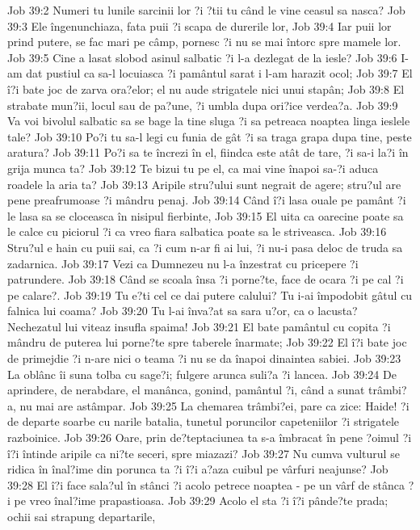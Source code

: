 Job 39:2  Numeri tu lunile sarcinii lor ?i ?tii tu când le vine ceasul sa nasca?
Job 39:3  Ele îngenunchiaza, fata puii ?i scapa de durerile lor,
Job 39:4  Iar puii lor prind putere, se fac mari pe câmp, pornesc ?i nu se mai întorc spre mamele lor.
Job 39:5  Cine a lasat slobod asinul salbatic ?i l-a dezlegat de la iesle?
Job 39:6  I-am dat pustiul ca sa-l locuiasca ?i pamântul sarat i l-am harazit ocol;
Job 39:7  El î?i bate joc de zarva ora?elor; el nu aude strigatele nici unui stapân;
Job 39:8  El strabate mun?ii, locul sau de pa?une, ?i umbla dupa ori?ice verdea?a.
Job 39:9  Va voi bivolul salbatic sa se bage la tine sluga ?i sa petreaca noaptea linga ieslele tale?
Job 39:10  Po?i tu sa-l legi cu funia de gât ?i sa traga grapa dupa tine, peste aratura?
Job 39:11  Po?i sa te încrezi în el, fiindca este atât de tare, ?i sa-i la?i în grija munca ta?
Job 39:12  Te bizui tu pe el, ca mai vine înapoi sa-?i aduca roadele la aria ta?
Job 39:13  Aripile stru?ului sunt negrait de agere; stru?ul are pene preafrumoase ?i mândru penaj.
Job 39:14  Când î?i lasa ouale pe pamânt ?i le lasa sa se cloceasca în nisipul fierbinte,
Job 39:15  El uita ca oarecine poate sa le calce cu piciorul ?i ca vreo fiara salbatica poate sa le striveasca.
Job 39:16  Stru?ul e hain cu puii sai, ca ?i cum n-ar fi ai lui, ?i nu-i pasa deloc de truda sa zadarnica.
Job 39:17  Vezi ca Dumnezeu nu l-a înzestrat cu pricepere ?i patrundere.
Job 39:18  Când se scoala însa ?i porne?te, face de ocara ?i pe cal ?i pe calare?.
Job 39:19  Tu e?ti cel ce dai putere calului? Tu i-ai împodobit gâtul cu falnica lui coama?
Job 39:20  Tu l-ai înva?at sa sara u?or, ca o lacusta? Nechezatul lui viteaz insufla spaima!
Job 39:21  El bate pamântul cu copita ?i mândru de puterea lui porne?te spre taberele înarmate;
Job 39:22  El î?i bate joc de primejdie ?i n-are nici o teama ?i nu se da înapoi dinaintea sabiei.
Job 39:23  La oblânc îi suna tolba cu sage?i; fulgere arunca suli?a ?i lancea.
Job 39:24  De aprindere, de nerabdare, el manânca, gonind, pamântul ?i, când a sunat trâmbi?a, nu mai are astâmpar.
Job 39:25  La chemarea trâmbi?ei, pare ca zice: Haide! ?i de departe soarbe cu narile batalia, tunetul poruncilor capeteniilor ?i strigatele razboinice.
Job 39:26  Oare, prin de?teptaciunea ta s-a îmbracat în pene ?oimul ?i î?i întinde aripile ca ni?te seceri, spre miazazi?
Job 39:27  Nu cumva vulturul se ridica în înal?ime din porunca ta ?i î?i a?aza cuibul pe vârfuri neajunse?
Job 39:28  El î?i face sala?ul în stânci ?i acolo petrece noaptea - pe un vârf de stânca ?i pe vreo înal?ime prapastioasa.
Job 39:29  Acolo el sta ?i î?i pânde?te prada; ochii sai strapung departarile,
